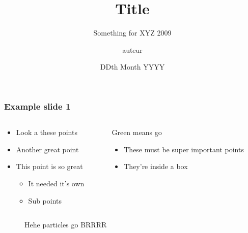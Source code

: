 \documentclass[11pt, aspectratio=169]{beamer}
\title{Title}
\subtitle{Something for XYZ 2009}
\author{auteur}
\institute{Plateforme Imagerie, Robotique et Innovation en Santé}
\date{DDth Month YYYY}
\begin{document}

\frame{\titlepage}

\begin{frame}
    \frametitle{Example slide 1}

    \begin{columns}
        \begin{column}{0.5\textwidth}

            \begin{itemize}
                \item Look a these points
                \item Another great point
                \item This point is so great
                      \begin{itemize}
                          \item It needed it's own
                          \item Sub points
                      \end{itemize}
            \end{itemize}
        \end{column}
        \begin{column}{0.5\textwidth}

            \begin{block}{Green means go}
                \begin{itemize}
                    \item
                          These must be super important points
                    \item
                          They're inside a box
                \end{itemize}
            \end{block}

        \end{column}
    \end{columns}

    \vfill
    \begin{figure}
        \centering
        {\def\svgwidth{0.7\textwidth}\footnotesize}
        \caption{Hehe particles go BRRRR}
        \label{fig:my_label}
    \end{figure}
\end{frame}
\end{document}
